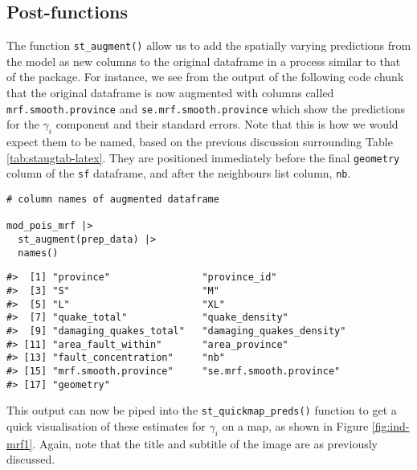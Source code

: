 \hypertarget{post-functions-1}{%
\subsection{Post-functions}\label{post-functions-1}}

The function \texttt{st\_augment()} allow us to add the spatially varying predictions from the model as new columns to the original dataframe in a process
similar to that of the  package. For instance, we see from the output of the following code chunk that the original dataframe is now augmented with columns called \texttt{mrf.smooth.province} and \texttt{se.mrf.smooth.province} which show the predictions for the \(\gamma_i\) component and their standard errors. Note that this is how we would expect them to be named, based on the previous discussion surrounding Table \ref{tab:staugtab-latex}. They are positioned immediately before the final \texttt{geometry} column of the \texttt{sf} dataframe, and after the neighbours list column, \texttt{nb}.

\begin{verbatim}
# column names of augmented dataframe

mod_pois_mrf |> 
  st_augment(prep_data) |> 
  names()
\end{verbatim}

\begin{verbatim}
#>  [1] "province"                "province_id"            
#>  [3] "S"                       "M"                      
#>  [5] "L"                       "XL"                     
#>  [7] "quake_total"             "quake_density"          
#>  [9] "damaging_quakes_total"   "damaging_quakes_density"
#> [11] "area_fault_within"       "area_province"          
#> [13] "fault_concentration"     "nb"                     
#> [15] "mrf.smooth.province"     "se.mrf.smooth.province" 
#> [17] "geometry"
\end{verbatim}

This output can now be piped into the \texttt{st\_quickmap\_preds()} function to get a quick visualisation of
these estimates for \(\gamma_i\) on a map, as shown in Figure \ref{fig:ind-mrf1}. Again, note that the title and subtitle of the image are as previously discussed.



